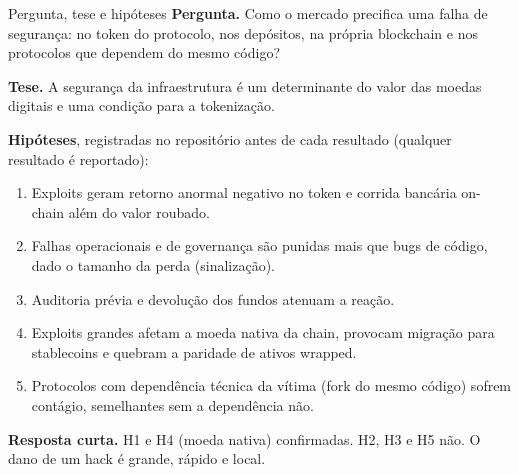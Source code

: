 \documentclass[aspectratio=169,10pt]{beamer}
\begin{document}
\begin{frame}[t]{Pergunta, tese e hipóteses}
\small
\textbf{Pergunta.} Como o mercado precifica uma falha de segurança: no token do protocolo, nos depósitos, na própria blockchain e nos protocolos que dependem do mesmo código?

\smallskip
\textbf{Tese.} A segurança da infraestrutura é um determinante do valor das moedas digitais e uma condição para a tokenização.

\smallskip
\textbf{Hipóteses}, registradas no repositório antes de cada resultado (qualquer resultado é reportado):
\begin{enumerate}\footnotesize\setlength{\itemsep}{0pt}
\item[H1] Exploits geram retorno anormal negativo no token e corrida bancária on-chain além do valor roubado.
\item[H2] Falhas operacionais e de governança são punidas mais que bugs de código, dado o tamanho da perda (sinalização).
\item[H3] Auditoria prévia e devolução dos fundos atenuam a reação.
\item[H4] Exploits grandes afetam a moeda nativa da chain, provocam migração para stablecoins e quebram a paridade de ativos wrapped.
\item[H5] Protocolos com dependência técnica da vítima (fork do mesmo código) sofrem contágio, semelhantes sem a dependência não.
\end{enumerate}

\smallskip
\textbf{Resposta curta.} H1 e H4 (moeda nativa) confirmadas. H2, H3 e H5 não. \alert{O dano de um hack é grande, rápido e local}.
\end{frame}
\end{document}
